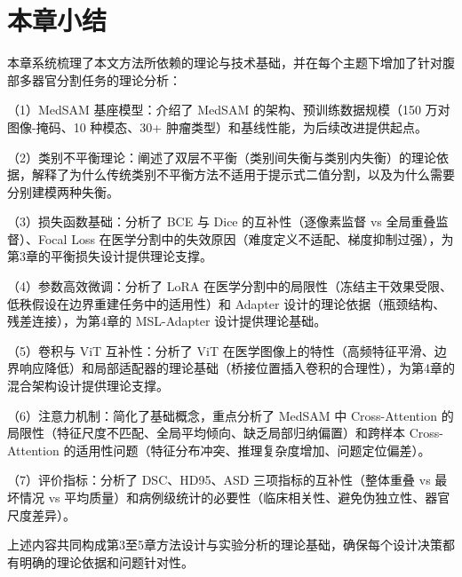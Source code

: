 \section{本章小结}

本章系统梳理了本文方法所依赖的理论与技术基础，并在每个主题下增加了针对腹部多器官分割任务的理论分析：

（1）MedSAM 基座模型：介绍了 MedSAM 的架构、预训练数据规模（150 万对图像-掩码、10 种模态、30+ 肿瘤类型）和基线性能，为后续改进提供起点。

（2）类别不平衡理论：阐述了双层不平衡（类别间失衡与类别内失衡）的理论依据，解释了为什么传统类别不平衡方法不适用于提示式二值分割，以及为什么需要分别建模两种失衡。

（3）损失函数基础：分析了 BCE 与 Dice 的互补性（逐像素监督 vs 全局重叠监督）、Focal Loss 在医学分割中的失效原因（难度定义不适配、梯度抑制过强），为第3章的平衡损失设计提供理论支撑。

（4）参数高效微调：分析了 LoRA 在医学分割中的局限性（冻结主干效果受限、低秩假设在边界重建任务中的适用性）和 Adapter 设计的理论依据（瓶颈结构、残差连接），为第4章的 MSL-Adapter 设计提供理论基础。

（5）卷积与 ViT 互补性：分析了 ViT 在医学图像上的特性（高频特征平滑、边界响应降低）和局部适配器的理论基础（桥接位置插入卷积的合理性），为第4章的混合架构设计提供理论支撑。

（6）注意力机制：简化了基础概念，重点分析了 MedSAM 中 Cross-Attention 的局限性（特征尺度不匹配、全局平均倾向、缺乏局部归纳偏置）和跨样本 Cross-Attention 的适用性问题（特征分布冲突、推理复杂度增加、问题定位偏差）。

（7）评价指标：分析了 DSC、HD95、ASD 三项指标的互补性（整体重叠 vs 最坏情况 vs 平均质量）和病例级统计的必要性（临床相关性、避免伪独立性、器官尺度差异）。

上述内容共同构成第3至5章方法设计与实验分析的理论基础，确保每个设计决策都有明确的理论依据和问题针对性。
